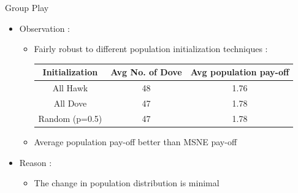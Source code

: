 \documentclass{IFES-beamer}
\begin{document}
        \begin{frame}{Group Play}
            \begin{itemize}
                \item Observation :
                    \begin{itemize}
                        \item Fairly robust to different population initialization techniques :\\
                            \begin{table}[H]
                              \begin{center}
                                \begin{tabular}{|c|c|c|} %
                                \hline
                                Initialization & Avg No. of Dove & Avg population pay-off\\
                                  \hline
                                  All Hawk & 48 & 1.76 \\
                                  \hline
                                  All Dove & 47 & 1.78 \\
                                  \hline
                                  Random (p=0.5) & 47 & 1.78 \\
                                  \hline
                                \end{tabular}
                              \end{center}
                            \end{table}
                        \item Average population pay-off better than MSNE pay-off
                    \end{itemize}
                \item Reason :
                    \begin{itemize}
                        \item The change in population distribution is minimal
                    \end{itemize}
            \end{itemize}
        \end{frame}

\end{document}
